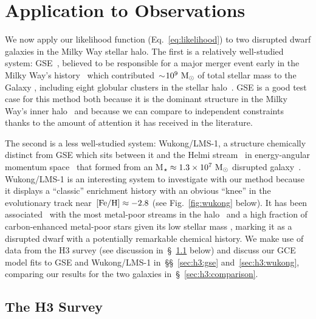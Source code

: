 \documentclass[foo.tex]{subfiles}
\begin{document}
\section{Application to Observations}
\label{sec:h3}

We now apply our likelihood function (Eq.~\ref{eq:likelihood}) to two
disrupted dwarf galaxies in the Milky Way stellar halo.
The first is a relatively well-studied system: GSE~\citep{Belokurov2018,
Helmi2018, Haywood2018, Myeong2018, Mackereth2019}, believed to be responsible
for a major merger event early in the Milky Way's history~\citep{Gallart2019,
Bonaca2020, Chaplin2020, Montalban2021, Xiang2022} which
contributed~$\sim$$10^9~\text{M}_\odot$ of total stellar mass to the Galaxy
\citep{Deason2019, Fattahi2019, Mackereth2019, Vincenzo2019, Kruijssen2020,
Han2022}, including eight globular clusters in the stellar
halo~\citep{Myeong2018, Massari2019, Kruijssen2019, Forbes2020}.
GSE is a good test case for this method both because it is the dominant
structure in the Milky Way's inner halo~\citep{Helmi2018} and because we can
compare to independent constraints thanks to the amount of attention it has
received in the literature.



The second is a less well-studied system: Wukong/LMS-1, a structure chemically
distinct from GSE which sits between it and the Helmi stream~\citep{Helmi1999}
in energy-angular momentum space~\citep{Naidu2020, Yuan2020} that
formed from an M$_\star \approx 1.3\times10^{7}~\text{M}_\odot$ disrupted
galaxy~\citep{Naidu2022}.
Wukong/LMS-1 is an interesting system to investigate with our method
because it displays a ``classic'' enrichment history with an obvious ``knee''
in the evolutionary track near~$\text{[Fe/H]} \approx -2.8$ (see Fig.~\ref{fig:wukong}
below).
It has been associated~\citep{Malhan2022} with the most metal-poor streams in
the halo~\citep[e.g.,][]{Roederer2019, Wan2020, Martin2022} and a high fraction
of carbon-enhanced metal-poor stars given its low stellar mass
\citep{Shank2022, Zepeda2022}, marking it as a disrupted dwarf with a
potentially remarkable chemical history.
We make use of data from the H3 survey (see discussion
in~\S~\ref{sec:h3:survey} below) and discuss our GCE model fits to GSE and
Wukong/LMS-1 in~\S\S~\ref{sec:h3:gse} and~\ref{sec:h3:wukong}, comparing our
results for the two galaxies in~\S~\ref{sec:h3:comparison}.

\subsection{The H3 Survey}
\label{sec:h3:survey}
\end{document}
